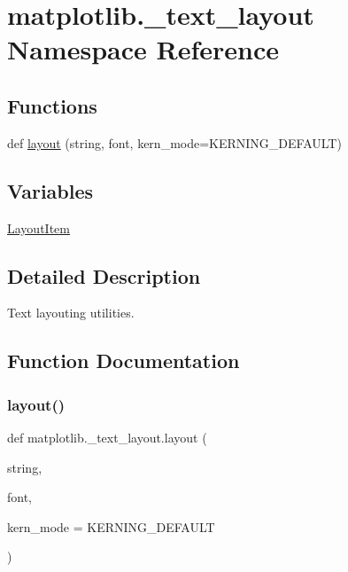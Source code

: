 \hypertarget{namespacematplotlib_1_1__text__layout}{}\section{matplotlib.\+\_\+text\+\_\+layout Namespace Reference}
\label{namespacematplotlib_1_1__text__layout}
\subsection*{Functions}
\begin{DoxyCompactItemize}
\item 
def \hyperlink{namespacematplotlib_1_1__text__layout_a5084556602e59bed17c982150c649b8d}{layout} (string, font, kern\+\_\+mode=K\+E\+R\+N\+I\+N\+G\+\_\+\+D\+E\+F\+A\+U\+LT)
\end{DoxyCompactItemize}
\subsection*{Variables}
\begin{DoxyCompactItemize}
\item 
\hyperlink{namespacematplotlib_1_1__text__layout_a78dfba3922ceb65ef13eca17b681de6e}{Layout\+Item}
\end{DoxyCompactItemize}


\subsection{Detailed Description}
\begin{DoxyVerb}Text layouting utilities.
\end{DoxyVerb}
 

\subsection{Function Documentation}
\mbox{\label{namespacematplotlib_1_1__text__layout_a5084556602e59bed17c982150c649b8d}} 
\subsubsection{\texorpdfstring{layout()}{layout()}}
{\footnotesize\ttfamily def matplotlib.\+\_\+text\+\_\+layout.\+layout (\begin{DoxyParamCaption}\item[{}]{string,  }\item[{}]{font,  }\item[{}]{kern\+\_\+mode = {\ttfamily KERNING\+\_\+DEFAULT} }\end{DoxyParamCaption})}

